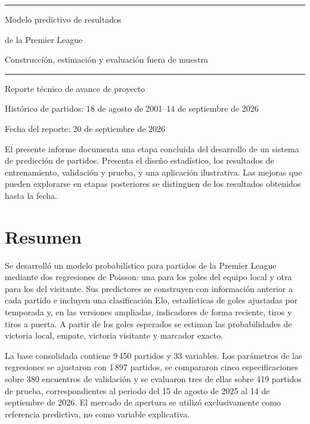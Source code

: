 \documentclass[11pt,a4paper]{article}
\begin{document}
\begin{titlepage}
\centering
\vspace*{2.7cm}
{\color{accent}\rule{\textwidth}{0.7pt}\par}
\vspace{1.0cm}
{\fontsize{22}{27}\selectfont Modelo predictivo de resultados\par de la Premier League\par}
\vspace{0.8cm}
{\large Construcción, estimación y evaluación fuera de muestra\par}
\vspace{1.0cm}
{\color{accent}\rule{\textwidth}{0.7pt}\par}
\vspace{1.5cm}
{\large Reporte técnico de avance de proyecto\par}
\vspace{0.5cm}
{\normalsize Histórico de partidos: 18 de agosto de 2001--14 de septiembre de 2026\par}
{\normalsize Fecha del reporte: 20 de septiembre de 2026\par}
\vfill
\begin{minipage}{0.86\textwidth}
\small
El presente informe documenta una etapa concluida del desarrollo de un sistema de predicción de partidos. Presenta el diseño estadístico, los resultados de entrenamiento, validación y prueba, y una aplicación ilustrativa. Las mejoras que pueden explorarse en etapas posteriores se distinguen de los resultados obtenidos hasta la fecha.
\end{minipage}
\vspace{1.1cm}
\end{titlepage}

\section{Resumen}
Se desarrolló un modelo probabilístico para partidos de la Premier League mediante dos regresiones de Poisson: una para los goles del equipo local y otra para los del visitante. Sus predictores se construyen con información anterior a cada partido e incluyen una clasificación Elo, estadísticas de goles ajustadas por temporada y, en las versiones ampliadas, indicadores de forma reciente, tiros y tiros a puerta. A partir de los goles esperados se estiman las probabilidades de victoria local, empate, victoria visitante y marcador exacto.

La base consolidada contiene 9\,450 partidos y 33 variables. Los parámetros de las regresiones se ajustaron con 1\,897 partidos, se compararon cinco especificaciones sobre 380 encuentros de validación y se evaluaron tres de ellas sobre 419 partidos de prueba, correspondientes al periodo del 15 de agosto de 2025 al 14 de septiembre de 2026. El mercado de apertura se utilizó exclusivamente como referencia predictiva, no como variable explicativa.
\end{document}
